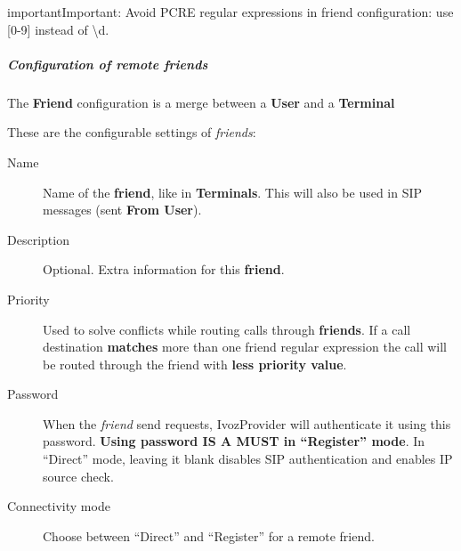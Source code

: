 \documentclass[letterpaper,10pt,english]{sphinxmanual}
\begin{document}
\begin{notice}{important}{Important:}
Avoid PCRE regular expressions in friend configuration: use {[}0-9{]} instead of \textbackslash{}d.
\end{notice}


\subparagraph{Configuration of remote friends}
\label{administration_portal/client/vpbx/routing_endpoints/friends/remote_friends:configuration-of-remote-friends}
The \textbf{Friend} configuration is a merge between a \textbf{User} and a \textbf{Terminal}

These are the configurable settings of \emph{friends}:
\begin{description}
\item[{Name}] \leavevmode{}\label{administration_portal/client/vpbx/routing_endpoints/friends/remote_friends:term-name}
Name of the \textbf{friend}, like in \textbf{Terminals}. This will also be used
in SIP messages (sent \textbf{From User}).

\item[{Description}] \leavevmode{}\label{administration_portal/client/vpbx/routing_endpoints/friends/remote_friends:term-description}
Optional. Extra information for this \textbf{friend}.

\item[{Priority}] \leavevmode{}\label{administration_portal/client/vpbx/routing_endpoints/friends/remote_friends:term-priority}
Used to solve conflicts while routing calls through \textbf{friends}.
If a call destination \textbf{matches} more than one friend regular expression
the call will be routed through the friend with \textbf{less priority value}.

\item[{Password}] \leavevmode{}\label{administration_portal/client/vpbx/routing_endpoints/friends/remote_friends:term-password}
When the \emph{friend} send requests, IvozProvider will authenticate it using
this password. \textbf{Using password IS A MUST in ``Register'' mode}. In ``Direct'' mode,
leaving it blank disables SIP authentication and enables IP source check.

\item[{Connectivity mode}] \leavevmode{}\label{administration_portal/client/vpbx/routing_endpoints/friends/remote_friends:term-connectivity-mode}
Choose between ``Direct'' and ``Register'' for a remote friend.


\end{description}
\end{document}
